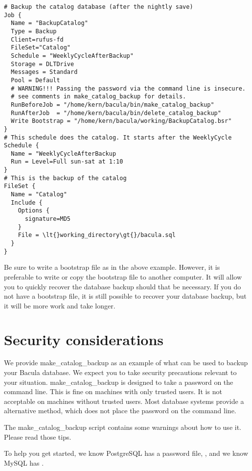 \footnotesize
\begin{verbatim}
# Backup the catalog database (after the nightly save)
Job {
  Name = "BackupCatalog"
  Type = Backup
  Client=rufus-fd
  FileSet="Catalog"
  Schedule = "WeeklyCycleAfterBackup"
  Storage = DLTDrive
  Messages = Standard
  Pool = Default
  # WARNING!!! Passing the password via the command line is insecure.
  # see comments in make_catalog_backup for details.
  RunBeforeJob = "/home/kern/bacula/bin/make_catalog_backup"
  RunAfterJob  = "/home/kern/bacula/bin/delete_catalog_backup"
  Write Bootstrap = "/home/kern/bacula/working/BackupCatalog.bsr"
}
# This schedule does the catalog. It starts after the WeeklyCycle
Schedule {
  Name = "WeeklyCycleAfterBackup
  Run = Level=Full sun-sat at 1:10
}
# This is the backup of the catalog
FileSet {
  Name = "Catalog"
  Include {
    Options {
      signature=MD5
    }
    File = \lt{}working_directory\gt{}/bacula.sql
  }
}
\end{verbatim}
\normalsize

Be sure to write a bootstrap file as in the above example. However, it is preferable
to write or copy the bootstrap file to another computer. It will allow
you to quickly recover the database backup should that be necessary.  If
you do not have a bootstrap file, it is still possible to recover your
database backup, but it will be more work and take longer. 


\label{BackingUpBaculaSecurityConsiderations}
\section{Security considerations}

We provide make\_catalog\_backup as an example of what can be used to backup
your Bacula database.  We expect you to take security precautions relevant
to your situation.  make\_catalog\_backup is designed to take a password on
the command line.  This is fine on machines with only trusted users.  It is
not acceptable on machines without trusted users.  Most database systems
provide a alternative method, which does not place the password on the
command line.

The make\_catalog\_backup script contains some warnings about how to use it. Please
read those tips.

To help you get started, we know PostgreSQL has a password file,
, and
we know MySQL has
.

